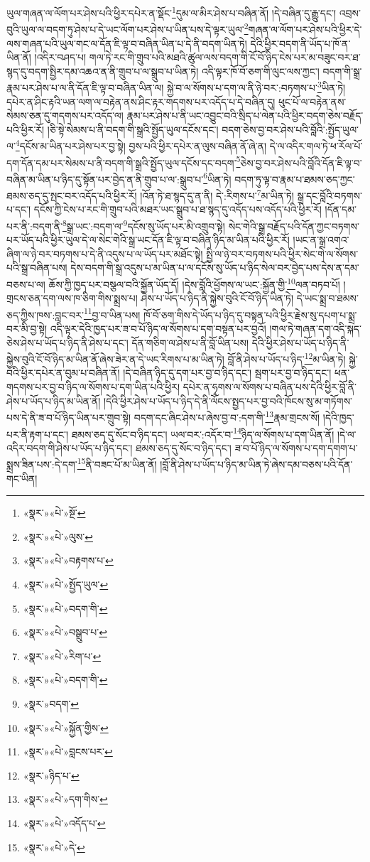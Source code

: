 ཡུལ་གཞན་ལ་ལོག་པར་ཤེས་པའི་ཕྱིར་དཔེར་ན་སྡོང་\footnote{«སྣར་»«པེ་»སྔོ་}དུམ་ལ་མིར་ཤེས་པ་བཞིན་ནོ། །དེ་བཞིན་དུ་རྒྱུ་དང་། འབྲས་བུའི་ཡུལ་ལ་བདག་ཏུ་ཤེས་པ་དེ་ཡང་ལོག་པར་ཤེས་པ་ཡིན་པས་དེ་ལྟར་ཡུལ་\footnote{«སྣར་»«པེ་»ལུས་}གཞན་ལ་ལོག་པར་ཤེས་པའི་ཕྱིར་དེ་ལས་གཞན་པའི་ཡུལ་གང་ལ་དོན་ཇི་ལྟ་བ་བཞིན་ཡིན་པ་དེ་ནི་བདག་ཡིན་ཏེ། དེའི་ཕྱིར་བདག་ནི་ཡོད་པ་ཁོ་ན་ཡིན་ནོ། །འདིར་བཤད་པ། གལ་ཏེ་རང་གི་གྲུབ་པའི་མཐའི་ཚུལ་ལས་བདག་གི་ངོ་བོ་ཉིད་ངེས་པར་མ་བཟུང་བར་ཐ་སྙད་དུ་བདག་སྤྱིར་དམ་འཆའ་ན་ནི་གྲུབ་པ་ལ་སྒྲུབ་པ་ཡིན་ཏེ། འདི་ལྟར་ཁོ་བོ་ཅག་གི་ལུང་ལས་ཀྱང་། བདག་གི་སྒྲ་རྣམ་པར་ཤེས་པ་ལ་ནི་དོན་ཇི་ལྟ་བ་བཞིན་ཡིན་ལ། སྐྱེ་བ་ལ་སོགས་པ་དག་ལ་ནི་ཉེ་བར་:བཏགས་པ་\footnote{«སྣར་»«པེ་»བརྟགས་པ་}ཡིན་ཏེ། དཔེར་ན་ཤིང་རྟའི་ཡན་ལག་ལ་བརྟེན་ནས་ཤིང་རྟར་གདགས་པར་འདོད་པ་དེ་བཞིན་དུ། ཕུང་པོ་ལ་བརྟེན་ནས་སེམས་ཅན་དུ་གདགས་པར་འདོད་ལ། རྣམ་པར་ཤེས་པ་ནི་ཡང་འབྱུང་བའི་སྲིད་པ་ལེན་པའི་ཕྱིར་བདག་ཅེས་བརྗོད་པའི་ཕྱིར་རོ། །ཅི་སྟེ་སེམས་པ་ནི་བདག་གི་སྒྲའི་སྤྱོད་ཡུལ་དངོས་དང་། བདག་ཅེས་བྱ་བར་ཤེས་པའི་བློའི་:སྤྱོད་ཡུལ་ལ་\footnote{«སྣར་»«པེ་»སྤྱོད་ཡུལ་}དངོས་མ་ཡིན་པར་ཤེས་པར་བྱ་སྟེ། བྱས་པའི་ཕྱིར་དཔེར་ན་ལུས་བཞིན་ནོ་ཞེ་ན། དེ་ལ་འདིར་གལ་ཏེ་ཕ་རོལ་པོ་དག་དོན་དམ་པར་སེམས་པ་ནི་བདག་གི་སྒྲའི་སྤྱོད་ཡུལ་དངོས་དང་བདག་\footnote{«སྣར་»«པེ་»བདག་གི་}ཅེས་བྱ་བར་ཤེས་པའི་བློའི་དོན་ཇི་ལྟ་བ་བཞིན་མ་ཡིན་པ་ཉིད་དུ་སྟོན་པར་བྱེད་ན་ནི་གྲུབ་པ་ལ་:སྒྲུབ་པ་\footnote{«སྣར་»«པེ་»བསྒྲུབ་པ་}ཡིན་ཏེ། བདག་ཏུ་ལྟ་བ་རྣམ་པ་ཐམས་ཅད་ཀྱང་ཐམས་ཅད་དུ་སྤང་བར་འདོད་པའི་ཕྱིར་རོ། །འོན་ཏེ་ཐ་སྙད་དུ་ན་ནི། དེ་:རིགས་པ་\footnote{«སྣར་»«པེ་»རིག་པ་}མ་ཡིན་ཏེ། སྒྲ་དང་བློའི་བཏགས་པ་དང་། དངོས་ཀྱི་ངེས་པ་རང་གི་གྲུབ་པའི་མཐར་ཡང་སྒྲུབ་པ་ཐ་སྙད་དུ་འདོད་པས་འདོད་པའི་ཕྱིར་རོ། །དོན་དམ་པར་ནི་:བདག་ནི་\footnote{«སྣར་»«པེ་»བདག་གི་}སྒྲ་ཡང་:བདག་ལ་\footnote{«སྣར་»བདག་}དངོས་སུ་ཡོད་པར་མི་འགྲུབ་སྟེ། སེང་གེའི་སྒྲ་བརྗོད་པའི་དོན་ཀྱང་བཏགས་པར་ཡོད་པའི་ཕྱིར་ཡུལ་དེ་ལ་སེང་གེའི་སྒྲ་ཡང་དོན་ཇི་ལྟ་བ་བཞིན་ཉིད་མ་ཡིན་པའི་ཕྱིར་རོ། །ཡང་ན་སྒྲ་འགའ་ཞིག་ལ་ཉེ་བར་བཏགས་པ་དེ་ནི་འདུས་པ་ལ་ཡོད་པར་མཐོང་སྟེ། སྤྱི་ལ་ཉེ་བར་བཏགས་པའི་ཕྱིར་སེང་གེ་ལ་སོགས་པའི་སྒྲ་བཞིན་པས། དེས་བདག་གི་སྒྲ་འདུས་པ་མ་ཡིན་པ་ལ་དངོས་སུ་ཡོད་པ་ཉིད་སེལ་བར་བྱེད་པས་དེས་ན་དམ་བཅས་པ་ལ། ཆོས་ཀྱི་ཁྱད་པར་བསྩལ་བའི་སྐྱོན་ཡོད་དོ། །དེས་བློའི་ཕྱོགས་ལ་ཡང་:སྐྱོན་གྱི་\footnote{«སྣར་»«པེ་»སྐྱོན་གྱིས་}ལན་བཏབ་པོ། །གྲངས་ཅན་དག་ལས་ཁ་ཅིག་གིས་སྨྲས་པ། ཤེས་པ་ཡོད་པ་ཉིད་ནི་སྐྱེས་བུའི་ངོ་བོ་ཉིད་ཡིན་ཏེ། དེ་ཡང་སྨྲ་བ་ཐམས་ཅད་ཀྱིས་ཁས་:བླང་བར་\footnote{«སྣར་»«པེ་»བླངས་པར་}བྱ་བ་ཡིན་པས། ཁོ་བོ་ཅག་གིས་དེ་ཡོད་པ་ཉིད་དུ་བསྟན་པའི་ཕྱིར་རྗེས་སུ་དཔག་པ་སྨྲ་བར་མི་བྱ་སྟེ། འདི་ལྟར་དེའི་ཁྱད་པར་ཟ་བ་པོ་ཉིད་ལ་སོགས་པ་དག་བསྟན་པར་བྱའོ། །གལ་ཏེ་གཞན་དག་འདི་སྐད་ཅེས་ཤེས་པ་ཡོད་པ་ཉིད་ནི་ཤེས་པ་དང་། དོན་གཅིག་ལ་ཤེས་པ་ནི་བློ་ཡིན་པས། དེའི་ཕྱིར་ཤེས་པ་ཡོད་པ་ཉིད་ནི་སྐྱེས་བུའི་ངོ་བོ་ཉིད་མ་ཡིན་ནོ་ཞེས་ཟེར་ན་དེ་ཡང་རིགས་པ་མ་ཡིན་ཏེ། བློ་ནི་ཤེས་པ་ཡོད་པ་ཉིད་\footnote{«སྣར་»ཉིད་པ་}མ་ཡིན་ཏེ། སྐྱེ་བའི་ཕྱིར་དཔེར་ན་བུམ་པ་བཞིན་ནོ། །དེ་བཞིན་ཉིད་དུ་དག་པར་བྱ་བ་ཉིད་དང་། སྦག་པར་བྱ་བ་ཉིད་དང་། ཕན་གདགས་པར་བྱ་བ་ཉིད་ལ་སོགས་པ་དག་ཡིན་པའི་ཕྱིར། དཔེར་ན་ཧྭགས་ལ་སོགས་པ་བཞིན་པས་དེའི་ཕྱིར་བློ་ནི་ཤེས་པ་ཡོད་པ་ཉིད་མ་ཡིན་ནོ། །དེའི་ཕྱིར་ཤེས་པ་ཡོད་པ་ཉིད་དེ་ནི་ལོངས་སྤྱད་པར་བྱ་བའི་ཁོངས་སུ་མ་གཏོགས་པས་དེ་ནི་ཟ་བ་པོ་ཉིད་ཡིན་པར་གྲུབ་སྟེ། བདག་དང་ཞིང་ཤེས་པ་ཞེས་བྱ་བ་:དག་གི་\footnote{«སྣར་»«པེ་»དག་གིས་}རྣམ་གྲངས་སོ། །དེའི་ཁྱད་པར་ནི་རྟག་པ་དང་། ཐམས་ཅད་དུ་སོང་བ་ཉིད་དང་། ཡལ་བར་:འདོར་བ་\footnote{«སྣར་»«པེ་»འདོད་པ་}ཉིད་ལ་སོགས་པ་དག་ཡིན་ནོ། །དེ་ལ་འདིར་བདག་གི་ཤེས་པ་ཡོད་པ་ཉིད་དང་། ཐམས་ཅད་དུ་སོང་བ་ཉིད་དང་། ཟ་བ་པོ་ཉིད་ལ་སོགས་པ་དག་དགག་པ་སྨྲས་ཟིན་པས་:དེ་དག་\footnote{«སྣར་»«པེ་»དེ་}ནི་བཟང་པོ་མ་ཡིན་ནོ། །བློ་ནི་ཤེས་པ་ཡོད་པ་ཉིད་མ་ཡིན་ཏེ་ཞེས་དམ་བཅས་པའི་དོན་གང་ཡིན། 